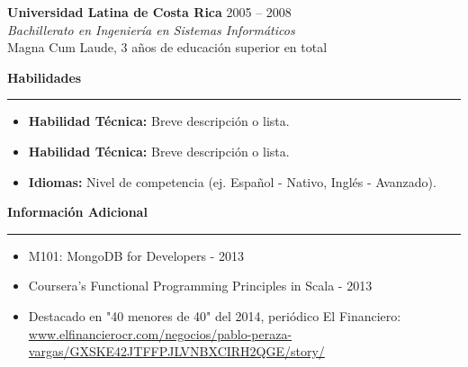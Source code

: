 \documentclass[a4paper,10pt]{article}
\newcommand{\sectiontitle}[1]{
	\vspace{10pt}
	{\large\textbf{#1}}
	\vspace{5pt}
	\hrule
	\vspace{5pt}
}
\begin{document}
	\textbf{Universidad Latina de Costa Rica} \hfill 2005 -- 2008 \\
	\emph{Bachillerato en Ingeniería en Sistemas Informáticos} \\
	Magna Cum Laude, 3 años de educación superior en total
	
	\sectiontitle{Habilidades}
	\begin{itemize}[leftmargin=*]
		\item \textbf{Habilidad Técnica:} Breve descripción o lista.
		\item \textbf{Habilidad Técnica:} Breve descripción o lista.
		\item \textbf{Idiomas:} Nivel de competencia (ej. Español - Nativo, Inglés - Avanzado).
	\end{itemize}
	
	\sectiontitle{Información Adicional}
	\begin{itemize}[leftmargin=*]
		\item M101: MongoDB for Developers - 2013
		\item Coursera’s Functional Programming Principles in Scala - 2013
		\item Destacado en "40 menores de 40" del 2014, periódico El Financiero: \href{https://www.elfinancierocr.com/negocios/pablo-peraza-vargas/GXSKE42JTFFPJLVNBXCIRH2QGE/story/}{www.elfinancierocr.com/negocios/pablo-peraza-vargas/GXSKE42JTFFPJLVNBXCIRH2QGE/story/}
	\end{itemize}
	
\end{document}
